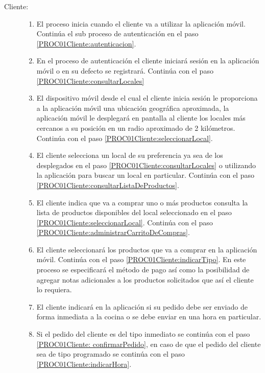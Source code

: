 \begin{description}
	\item[Cliente:]\hspace{1pt}
		
		\begin{enumerate}
			\item \label{PROC01Cliente:inicio} \init El proceso inicia cuando el cliente va a utilizar la aplicación móvil. Continúa el sub proceso de autenticación en el paso \ref{PROC01Cliente:autenticacion}.
			\item \label{PROC01Cliente:autenticacion}\process En el proceso de autenticación el cliente iniciará sesión en la aplicación móvil o en su defecto se registrará. Continúa con el paso \ref{PROC01Cliente:consultarLocales}
			\item \label{PROC01Cliente:consultarLocales}\task El dispositivo móvil desde el cual el cliente inicia sesión le proporciona a la aplicación móvil una ubicación geográfica aproximada, la aplicación móvil le desplegará en pantalla al cliente los locales más cercanos a su posición en un radio aproximado de 2 kilómetros. Continúa con el paso \ref{PROC01Cliente:seleccionarLocal}.
	\item \label{PROC01Cliente:seleccionarLocal} \task El cliente selecciona un local de su preferencia ya sea de los desplegados en el paso \ref{PROC01Cliente:consultarLocales} o utilizando la aplicación para buscar un local en particular. Continúa con el paso \ref{PROC01Cliente:consultarListaDeProductos}.
			\item \label{PROC01Cliente:consultarListaDeProductos}\task El cliente indica que va a comprar uno o más productos consulta la lista de productos disponibles del local seleccionado en el paso \ref{PROC01Cliente:seleccionarLocal}. Continúa con el paso \ref{PROC01Cliente:administrarCarritoDeCompras}.
			\item \label{PROC01Cliente:administrarCarritoDeCompras}\process El cliente seleccionará los productos que va a comprar en la aplicación móvil. Continúa con el paso \ref{PROC01Cliente:indicarTipo}. En este proceso se especificará el método de pago así como la posibilidad de agregar notas adicionales a los productos solicitados que así el cliente lo requiera.
			\item \label{PROC01Cliente:indicarTipo} \task El cliente indicará en la aplicación si su pedido debe ser enviado de forma inmediata a la cocina o se debe enviar en una hora en particular.
			\item \label{PROC01Cliente:gateUno} \gate Si el pedido del cliente es del tipo inmediato se continúa con el paso \ref{PROC01Cliente: confirmarPedido}, en caso de que el pedido del cliente sea de tipo programado se continúa con el paso \ref{PROC01Cliente:indicarHora}. 

\end{enumerate}
\end{description}
